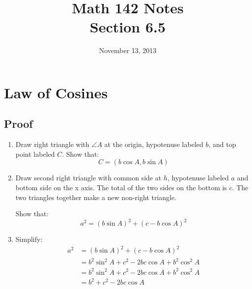 \documentclass{exam}
\title{Math 142 Notes \\ Section 6.5}
\date{November 13, 2013}
\begin{document}
  \maketitle
  \tableofcontents

  \section{Law of Cosines}

  \subsection{Proof}
  \begin{enumerate}
    \item Draw right triangle with $\angle A$ at the origin, hypotenuse labeled $b$, and top point labeled $C$.  Show that:
      \[
        C = (b \cos A, b \sin A)
      \]

    \item Draw second right triangle with common side at $h$, hypotenuse labeled $a$ and bottom side on the x axis.  The
      total of the two sides on the bottom is $c$.  The two triangles together make a new non-right triangle. 
      
      Show that:
      \[
        a^2 = \left( b \sin A \right)^2 + \left( c - b \cos A \right)^2 
      \]

    \item Simplify:
      \begin{align*}
        a^2 & = \left( b \sin A \right)^2 + \left( c - b \cos A \right)^2  \\
            & = b^2 \sin^2 A + c^2 - 2bc \cos A  + b^2 \cos^2 A \\
            & = b^2 \sin^2 A + c^2 - 2bc \cos A  + b^2 \cos^2 A \\
            & = b^2 + c^2 - 2bc \cos A \\
      \end{align*}

  \end{enumerate}
\end{document}
